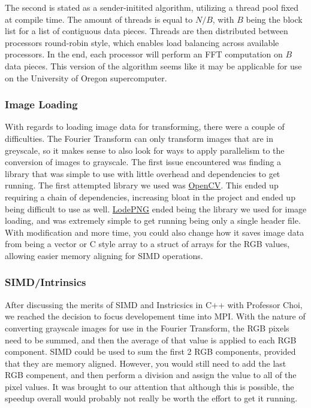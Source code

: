 \documentclass[12pt]{extarticle}
\begin{document}
    The second is stated as a sender-initited algorithm, utilizing a thread pool fixed at compile time. 
    The amount of threads is equal to $N/B$, with $B$ being the block list for a list of contiguous data pieces. 
    Threads are then distributed between processors round-robin style, which enables load balancing across available processors.
    In the end, each processor will perform an FFT computation on $B$ data pieces.
    This version of the algorithm seems like it may be applicable for use on the University of Oregon supercomputer.

	\subsubsection*{Image Loading}
	With regards to loading image data for transforming, there were a couple of difficulties. The Fourier Transform can only transform images
	that are in greyscale, so it makes sense to also look for ways to apply parallelism to the conversion of images to grayscale.
	The first issue encountered was finding a library that was simple to use with little overhead and dependencies to get running. 
	The first attempted library we used was \href{https://opencv.org/}{OpenCV}. This ended up requiring a chain of dependencies, increasing bloat 
	in the project and ended up being difficult to use as well. \href{https://lodev.org/lodepng/}{LodePNG} ended being the library we used for image loading,
	and was extremely simple to get running being only a single header file. With modification and more time, you could also change how it saves image data
	from being a vector or C style array to a struct of arrays for the  RGB values, allowing easier memory aligning for SIMD operations.
	
	\subsubsection*{SIMD/Intrinsics}
	After discussing the merits of SIMD and Instricsics in C++ with Professor Choi, we reached the decision to focus developement time into
	MPI. With the nature of converting grayscale images for use in the Fourier Transform, the RGB pixels need to be summed, and then the average
	of that value is applied to each RGB component. SIMD could be used to sum the first 2 RGB components, provided that they are memory aligned. 
	However, you would still need to add the last RGB compenent, and then perform a division and assign the value to all of the pixel values.
	It was brought to our attention that although this is possible, the speedup overall would probably not really be worth the effort to get it
	running.
\end{document}
